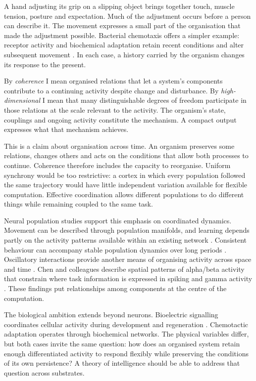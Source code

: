 \documentclass[11pt,a4paper]{article}
\begin{document}
A hand adjusting its grip on a slipping object brings together touch, muscle tension, posture and expectation. Much of the adjustment occurs before a person can describe it. The movement expresses a small part of the organisation that made the adjustment possible. Bacterial chemotaxis offers a simpler example: receptor activity and biochemical adaptation retain recent conditions and alter subsequent movement \citep{berg1972,wadhams2004}. In each case, a history carried by the organism changes its response to the present.

By \emph{coherence} I mean organised relations that let a system's components contribute to a continuing activity despite change and disturbance. By \emph{high-dimensional} I mean that many distinguishable degrees of freedom participate in those relations at the scale relevant to the activity. The organism's state, couplings and ongoing activity constitute the mechanism. A compact output expresses what that mechanism achieves.

This is a claim about organisation across time. An organism preserves some relations, changes others and acts on the conditions that allow both processes to continue. Coherence therefore includes the capacity to reorganise. Uniform synchrony would be too restrictive: a cortex in which every population followed the same trajectory would have little independent variation available for flexible computation. Effective coordination allows different populations to do different things while remaining coupled to the same task.

Neural population studies support this emphasis on coordinated dynamics. Movement can be described through population manifolds, and learning depends partly on the activity patterns available within an existing network \citep{gallego2017,sadtler2014}. Consistent behaviour can accompany stable population dynamics over long periods \citep{gallego2020}. Oscillatory interactions provide another means of organising activity across space and time \citep{siegel2012}. Chen and colleagues describe spatial patterns of alpha/beta activity that constrain where task information is expressed in spiking and gamma activity \citep{chen2026}. These findings put relationships among components at the centre of the computation.

The biological ambition extends beyond neurons. Bioelectric signalling coordinates cellular activity during development and regeneration \citep{levin2021}. Chemotactic adaptation operates through biochemical networks. The physical variables differ, but both cases invite the same question: how does an organised system retain enough differentiated activity to respond flexibly while preserving the conditions of its own persistence? A theory of intelligence should be able to address that question across substrates.
\end{document}
